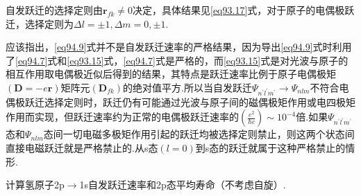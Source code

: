 自发跃迁的选择定则由$\boldsymbol{r}_{fk}\neq0$决定，具体结果见\eqref{eq93.17}式，对于原子的电偶极跃迁，选择定则为$\Delta l=\pm1,\Delta m=0,\pm1$.

应该指出，\eqref{eq94.9}式并不是自发跃迁速率的严格结果，因为导出\eqref{eq94.9}式时利用了\eqref{eq94.7}式和\eqref{eq93.15}式，\eqref{eq94.7}式是严格的，而\eqref{eq93.15}式是对光波与原子的相互作用取电偶极近似后得到的结果，其特点是跃迁速率比例于原子电偶极矩$(\boldsymbol{D}=-e\boldsymbol{r})$矩阵元$(\boldsymbol{D}_{fk})$的绝对值平方.所以当自发跃迁$\varPsi_{n^{\prime}l^{\prime}m^{\prime}}\rightarrow\varPsi_{nlm}$不符合电偶极跃迁选择定则时，跃迁仍有可能通过光波与原子间的磁偶极矩作用或电四极矩作用而实现，但跃迁速率约为正常的电偶极跃迁速率的$\left(\frac{e^{2}}{\hbar c}\right)\sim10^{-4}$倍.如果$\varPsi_{n^{\prime}l^{\prime}m^{\prime}}$态和$\varPsi_{nlm}$态间一切电磁多极矩作用引起的跃迁均被选择定则禁止，则这两个状态间直接电磁跃迁就是严格禁止的.从s态$(l=0)$到s态的跃迁就属于这种严格禁止的情形.

\pskip
\example 计算氢原子2p$\rightarrow$1s自发跃迁速率和2p态平均寿命（不考虑自旋）.

